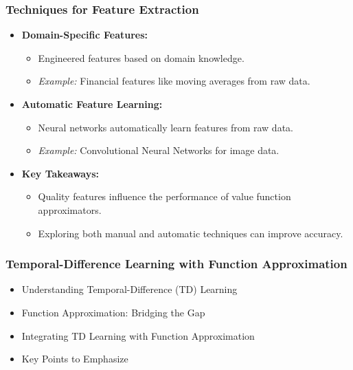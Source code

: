 \documentclass[aspectratio=169]{beamer}
\begin{document}
\begin{frame}[fragile]
  \frametitle{Techniques for Feature Extraction}
  
  \begin{itemize}
    \item \textbf{Domain-Specific Features:}
      \begin{itemize}
        \item Engineered features based on domain knowledge.
        \item \textit{Example:} Financial features like moving averages from raw data.
      \end{itemize}
      
    \item \textbf{Automatic Feature Learning:}
      \begin{itemize}
        \item Neural networks automatically learn features from raw data.
        \item \textit{Example:} Convolutional Neural Networks for image data.
      \end{itemize}
    
    \item \textbf{Key Takeaways:}
      \begin{itemize}
        \item Quality features influence the performance of value function approximators.
        \item Exploring both manual and automatic techniques can improve accuracy.
      \end{itemize}
  \end{itemize}
\end{frame}

\begin{frame}[fragile]
    \frametitle{Temporal-Difference Learning with Function Approximation}
    \begin{itemize}
        \item Understanding Temporal-Difference (TD) Learning
        \item Function Approximation: Bridging the Gap
        \item Integrating TD Learning with Function Approximation
        \item Key Points to Emphasize
    \end{itemize}
\end{frame}
\end{document}
